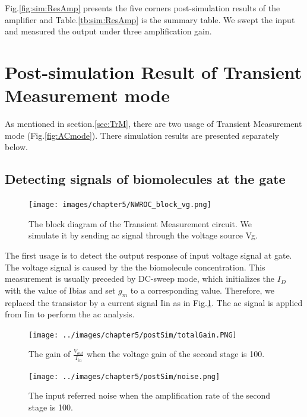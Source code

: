 {Fig.\ref{fig:sim:ResAmp} presents the five corners post-simulation results of the amplifier and Table.\ref{tb:sim:ResAmp} is the summary table.
We swept the input and measured the output under three amplification gain.







\section{Post-simulation Result of Transient Measurement mode}
As mentioned in section.\ref{sec:TrM}, there are two usage of Transient Measurement mode (Fig.\ref{fig:ACmode}).
There simulation results are presented separately below.

\subsection{Detecting signals of biomolecules at the gate}

\begin{figure}[!htbp]
    \centering
        \texttt{[image: images/chapter5/NWROC\_block\_vg.png]}
    \caption{The block diagram of the Transient Measurement circuit. We simulate it by sending ac signal through the voltage source Vg.}
    \label{fig:Nblockvg}
\end{figure}

The first usage is to detect the output response of input voltage signal at gate.
The voltage signal is caused by the the biomolecule concentration.
This measurement is usually preceded by DC-sweep mode, which initializes the $I_D$ with the value of Ibias and set $g_m$ to a corresponding value.
Therefore, we replaced the transistor by a current signal Iin as in Fig.\ref{fig:Nblockvg}.
The ac signal is applied from Iin to perform the ac analysis.

\begin{figure}[!htb]
    \centering
        \texttt{[image: ../images/chapter5/postSim/totalGain.PNG]}
    \caption{The gain of $\frac{V_{out}}{I_{in}}$ when the voltage gain of the second stage is 100.}
    \label{fig:sim:vgGain}
\end{figure}

\begin{figure}[!htb]
    \centering
        \texttt{[image: ../images/chapter5/postSim/noise.png]}
    \caption{The input referred noise when the amplification rate of the second stage is 100.}
    \label{fig:sim:vgnoise}
\end{figure}

}
